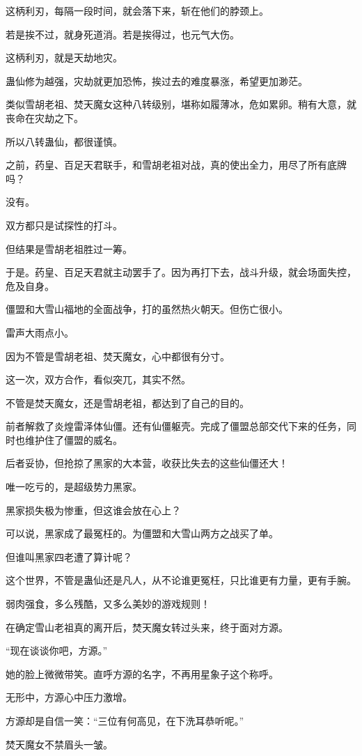 \begin{this_body}
这柄利刃，每隔一段时间，就会落下来，斩在他们的脖颈上。

若是挨不过，就身死道消。若是挨得过，也元气大伤。

这柄利刃，就是天劫地灾。

蛊仙修为越强，灾劫就更加恐怖，挨过去的难度暴涨，希望更加渺茫。

类似雪胡老祖、焚天魔女这种八转级别，堪称如履薄冰，危如累卵。稍有大意，就丧命在灾劫之下。

所以八转蛊仙，都很谨慎。

之前，药皇、百足天君联手，和雪胡老祖对战，真的使出全力，用尽了所有底牌吗？

没有。

双方都只是试探性的打斗。

但结果是雪胡老祖胜过一筹。

于是。药皇、百足天君就主动罢手了。因为再打下去，战斗升级，就会场面失控，危及自身。

僵盟和大雪山福地的全面战争，打的虽然热火朝天。但伤亡很小。

雷声大雨点小。

因为不管是雪胡老祖、焚天魔女，心中都很有分寸。

这一次，双方合作，看似突兀，其实不然。

不管是焚天魔女，还是雪胡老祖，都达到了自己的目的。

前者解救了炎煌雷泽体仙僵。还有仙僵躯壳。完成了僵盟总部交代下来的任务，同时也维护住了僵盟的威名。

后者妥协，但抢掠了黑家的大本营，收获比失去的这些仙僵还大！

唯一吃亏的，是超级势力黑家。

黑家损失极为惨重，但这谁会放在心上？

可以说，黑家成了最冤枉的。为僵盟和大雪山两方之战买了单。

但谁叫黑家四老遭了算计呢？

这个世界，不管是蛊仙还是凡人，从不论谁更冤枉，只比谁更有力量，更有手腕。

弱肉强食，多么残酷，又多么美妙的游戏规则！

在确定雪山老祖真的离开后，焚天魔女转过头来，终于面对方源。

“现在谈谈你吧，方源。”

她的脸上微微带笑。直呼方源的名字，不再用星象子这个称呼。

无形中，方源心中压力激增。

方源却是自信一笑：“三位有何高见，在下洗耳恭听呢。”

焚天魔女不禁眉头一皱。


\end{this_body}
